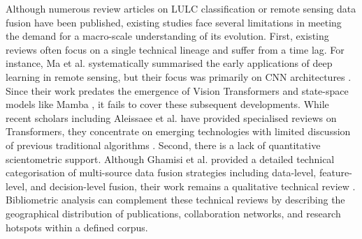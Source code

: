 \documentclass[]{interact}
\theoremstyle{plain}%
\theoremstyle{definition}
\theoremstyle{remark}
\DeclareRobustCommand{\DIFadd}[1]{{\protect\color{DIFaddcolor}\uwave{#1}}}
\DeclareRobustCommand{\DIFdel}[1]{{\protect\color{DIFdelcolor}\sout{#1}}}
\def\DIFadd#1{#1}%
\def\DIFdel#1{}%
\begin{document}
Although numerous review articles on LULC classification or remote sensing data fusion have been published, existing studies face several limitations in meeting the demand for a macro-scale understanding of \DIFdel{the} \DIFdel{field's} \DIFadd{its} evolution. First, existing reviews often focus on a single technical lineage and suffer from a time lag. For instance, Ma et al. systematically \DIFdel{summarized} \DIFadd{summarised} the early applications of deep learning in remote sensing, but their focus was primarily on CNN architectures {\hypersetup{citecolor=red}\color{red}\citep{ORIGma2019deep}} {\color{blue}\citep{56}}. Since their work predates the emergence of Vision \DIFdel{Foundation} \DIFdel{Models} \DIFdel{such} \DIFdel{as} \DIFdel{Transformer} \DIFadd{Transformers} and \DIFdel{State} \DIFdel{Space} \DIFdel{Models} \DIFadd{state-space} \DIFadd{models} like Mamba \DIFdel{after} \DIFdel{2020}, it fails to cover \DIFdel{the} \DIFdel{latest} \DIFdel{technical} \DIFdel{paradigm} \DIFdel{shifts} \DIFadd{these} \DIFadd{subsequent} \DIFadd{developments}. While recent scholars including Aleissaee et al. have provided \DIFdel{specialized} \DIFadd{specialised} reviews on Transformers, they concentrate on emerging technologies with limited discussion of previous traditional algorithms \citep{7}. Second, there is a lack of quantitative scientometric support. Although Ghamisi et al. provided a detailed technical \DIFdel{categorization} \DIFadd{categorisation} of multi-source data fusion strategies including data-level, feature-level, and decision-level fusion, their work remains a qualitative technical review {\hypersetup{citecolor=red}\color{red}\citep{ORIG6,7,8}} {\color{blue}\citep{6}}. \DIFdel{Such} \DIFdel{articles} \DIFdel{tend} \DIFdel{to} \DIFdel{list} \DIFdel{algorithmic} \DIFdel{details} \DIFdel{without} \DIFdel{the} \DIFdel{support} \DIFdel{of} \DIFdel{large-sample} \DIFdel{bibliometric} \DIFadd{Bibliometric} analysis\DIFdel{,} \DIFdel{making} \DIFdel{it} \DIFdel{difficult} \DIFdel{for} \DIFdel{researchers} \DIFdel{to} \DIFdel{objectively} \DIFdel{grasp} \DIFadd{can} \DIFadd{complement} \DIFadd{these} \DIFadd{technical} \DIFadd{reviews} \DIFadd{by} \DIFadd{describing} the geographical distribution of \DIFdel{global} \DIFdel{research} \DIFdel{power} \DIFadd{publications}, \DIFdel{the} \DIFdel{evolution} \DIFdel{of} collaboration networks, and \DIFdel{the} \DIFdel{spatio-temporal} \DIFdel{migration} \DIFdel{of} research hotspots \DIFdel{from} \DIFadd{within} a \DIFdel{macro} \DIFdel{perspective} \DIFadd{defined} \DIFadd{corpus}.
\end{document}

